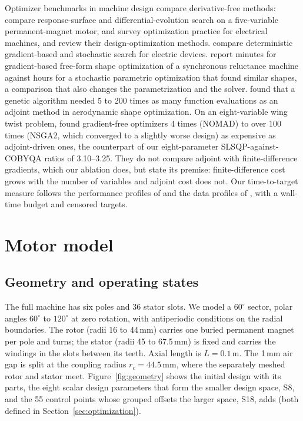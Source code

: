 \documentclass{anvil-paper}
\begin{document}
Optimizer benchmarks in machine design compare derivative-free methods:
\citet{duan2013review} compare response-surface and differential-evolution
search on a five-variable permanent-magnet motor, and
\citet{bramerdorfer2018modern} survey optimization practice for electrical
machines, and \citet{lei2017review} review their design-optimization
methods. \citet{ion2018robust} compare deterministic gradient-based and
stochastic search for electric devices. \citet{gangl2022multi} report
minutes for gradient-based free-form shape optimization of a synchronous
reluctance machine against hours for a stochastic parametric optimization
that found similar shapes, a comparison that also changes the
parametrization and the solver. \citet{zingg2008comparative}
found that a genetic algorithm needed 5 to 200 times as many function
evaluations as an adjoint method in aerodynamic shape optimization.
On an eight-variable wing twist problem, \citet{yu2018influence} found
gradient-free optimizers 4 times (NOMAD) to over 100 times (NSGA2, which
converged to a slightly worse design) as expensive as adjoint-driven ones,
the counterpart of our eight-parameter
SLSQP-against-COBYQA ratios of 3.10--3.25. They do not compare adjoint with
finite-difference gradients, which our ablation does, but state its premise:
finite-difference cost grows with the number of variables and adjoint cost does not. Our
time-to-target measure follows the performance profiles of
\citet{dolan2002benchmarking} and the data profiles of
\citet{more2009benchmarking}, with a wall-time budget and censored
targets.

\section{Motor model}\label{sec:model}
\subsection{Geometry and operating states}
The full machine has six poles and 36 stator slots. We model a
$60^\circ$ sector, polar angles $60^\circ$ to $120^\circ$ at zero
rotation, with antiperiodic conditions on the radial boundaries. The rotor
(radii 16 to 44\,mm) carries one buried permanent magnet per pole and
turns; the stator (radii 45 to 67.5\,mm) is fixed and carries the windings
in the slots between its teeth. Axial length is $L=0.1$\,m. The 1\,mm air
gap is split at the coupling radius $r_c=44.5$\,mm, where the separately
meshed rotor and stator meet. Figure~\ref{fig:geometry} shows the initial
design with its parts, the eight scalar design parameters that form the
smaller design space, S8, and the 55 control points whose grouped offsets
the larger space, S18, adds (both defined in
Section~\ref{sec:optimization}).
\end{document}
